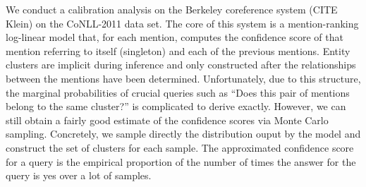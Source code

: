 We conduct a calibration analysis on the Berkeley coreference system (CITE Klein) on the CoNLL-2011 data set. The core of this system is a mention-ranking log-linear model that, for each mention, computes the confidence score of that mention referring to itself (singleton) and each of the previous mentions. Entity clusters are implicit during inference and only constructed after the relationships between the mentions have been determined. Unfortunately, due to this structure, the marginal probabilities of crucial queries such as ``Does this pair of mentions belong to the same cluster?'' is complicated to derive exactly. However, we can still obtain a fairly good estimate of the confidence scores via Monte Carlo sampling. Concretely, we sample directly the distribution ouput by the model and construct the set of clusters for each sample. The approximated confidence score for a query is the empirical proportion of the number of times the answer for the query is yes over a lot of samples. 


